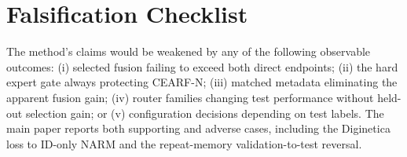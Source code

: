 \documentclass[runningheads]{llncs}
\newcommand{\method}{CEARF-N}
\begin{document}
\section{Falsification Checklist}
The method's claims would be weakened by any of the following observable
outcomes: (i) selected fusion failing to exceed both direct endpoints;
(ii) the hard expert gate always protecting \method{}; (iii) matched metadata
eliminating the apparent fusion gain; (iv) router families changing test
performance without held-out selection gain; or (v) configuration decisions
depending on test labels. The main paper reports both supporting and adverse
cases, including the Diginetica loss to ID-only NARM and the repeat-memory
validation-to-test reversal.
\end{document}
